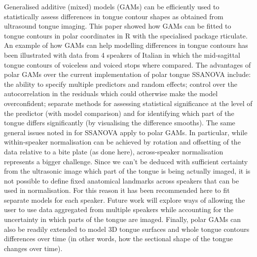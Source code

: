 \documentclass[12pt,]{article}
\begin{document}
Generalised additive (mixed) models (GAMs) can be efficiently used to
statistically assess differences in tongue contour shapes as obtained
from ultrasound tongue imaging. This paper showed how GAMs can be fitted
to tongue contours in polar coordinates in R with the specialised
package rticulate. An example of how GAMs can help modelling differences
in tongue contours has been illustrated with data from 4 speakers of
Italian in which the mid-sagittal tongue contours of voiceless and
voiced stops where compared. The advantages of polar GAMs over the
current implementation of polar tongue SSANOVA include: the ability to
specify multiple predictors and random effects; control over the
autocorrelation in the residuals which could otherwise make the model
overconfident; separate methods for assessing statistical significance
at the level of the predictor (with model comparison) and for
identifying which part of the tongue differs significantly (by
visualising the difference smooths). The same general issues noted in
\citet{davidson2006} for SSANOVA apply to polar GAMs. In particular,
while within-speaker normalisation can be achieved by rotation and
offsetting of the data relative to a bite plate (as done here),
across-speaker normalisation represents a bigger challenge. Since we
can't be deduced with sufficient certainty from the ultrasonic image
which part of the tongue is being actually imaged, it is not possible to
define fixed anatomical landmarks across speakers that can be used in
normalisation. For this reason it has been recommended here to fit
separate models for each speaker. Future work will explore ways of
allowing the user to use data aggregated from multiple speakers while
accounting for the uncertainty in which parts of the tongue are imaged.
Finally, polar GAMs can also be readily extended to model 3D tongue
surfaces and whole tongue contours differences over time (in other
words, how the sectional shape of the tongue changes over time).


\end{document}
